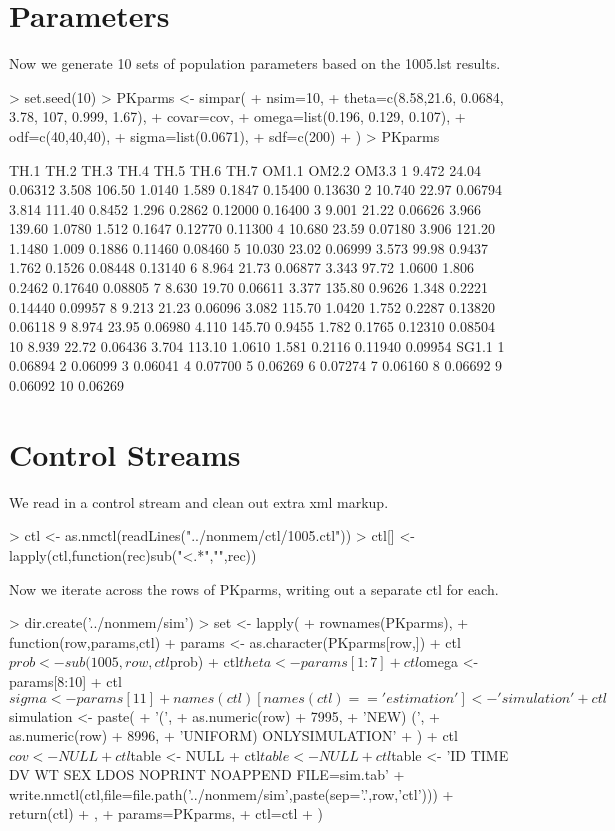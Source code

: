 \section{Parameters}
Now we generate 10 sets of population parameters based on the 1005.lst results.
\begin{Schunk}
\begin{Sinput}
> set.seed(10)
> PKparms <- simpar(
+     nsim=10,
+     theta=c(8.58,21.6, 0.0684, 3.78, 107, 0.999, 1.67),
+     covar=cov,
+     omega=list(0.196, 0.129, 0.107),
+     odf=c(40,40,40),
+     sigma=list(0.0671),
+     sdf=c(200)
+ )
> PKparms
\end{Sinput}
\begin{Soutput}
     TH.1  TH.2    TH.3  TH.4   TH.5   TH.6  TH.7  OM1.1   OM2.2   OM3.3
1   9.472 24.04 0.06312 3.508 106.50 1.0140 1.589 0.1847 0.15400 0.13630
2  10.740 22.97 0.06794 3.814 111.40 0.8452 1.296 0.2862 0.12000 0.16400
3   9.001 21.22 0.06626 3.966 139.60 1.0780 1.512 0.1647 0.12770 0.11300
4  10.680 23.59 0.07180 3.906 121.20 1.1480 1.009 0.1886 0.11460 0.08460
5  10.030 23.02 0.06999 3.573  99.98 0.9437 1.762 0.1526 0.08448 0.13140
6   8.964 21.73 0.06877 3.343  97.72 1.0600 1.806 0.2462 0.17640 0.08805
7   8.630 19.70 0.06611 3.377 135.80 0.9626 1.348 0.2221 0.14440 0.09957
8   9.213 21.23 0.06096 3.082 115.70 1.0420 1.752 0.2287 0.13820 0.06118
9   8.974 23.95 0.06980 4.110 145.70 0.9455 1.782 0.1765 0.12310 0.08504
10  8.939 22.72 0.06436 3.704 113.10 1.0610 1.581 0.2116 0.11940 0.09954
     SG1.1
1  0.06894
2  0.06099
3  0.06041
4  0.07700
5  0.06269
6  0.07274
7  0.06160
8  0.06692
9  0.06092
10 0.06269
\end{Soutput}
\end{Schunk}
\section{Control Streams}
We read in a control stream and clean out extra xml markup.
\begin{Schunk}
\begin{Sinput}
> ctl <- as.nmctl(readLines("../nonmem/ctl/1005.ctl"))
> ctl[] <- lapply(ctl,function(rec)sub("<.*","",rec))
\end{Sinput}
\end{Schunk}
Now we iterate across the rows of PKparms, writing out a separate ctl for each.
\begin{Schunk}
\begin{Sinput}
> dir.create('../nonmem/sim')
> set <- lapply(
+ 	rownames(PKparms),
+ 	function(row,params,ctl){
+ 		params <- as.character(PKparms[row,])
+ 		ctl$prob <- sub(1005,row,ctl$prob)
+ 		ctl$theta <- params[1:7]
+ 		ctl$omega <- params[8:10]
+ 		ctl$sigma <- params[11]
+ 		names(ctl)[names(ctl)=='estimation'] <- 'simulation'
+ 		ctl$simulation <- paste(
+ 			'(',
+ 			as.numeric(row) + 7995,
+ 			'NEW) (',
+ 			as.numeric(row) + 8996,
+ 			'UNIFORM) ONLYSIMULATION'
+ 		)
+ 		ctl$cov <- NULL
+ 		ctl$table <- NULL
+ 		ctl$table <- NULL
+ 		ctl$table <- 'ID TIME DV WT SEX LDOS NOPRINT NOAPPEND FILE=sim.tab'
+ 		write.nmctl(ctl,file=file.path('../nonmem/sim',paste(sep='.',row,'ctl')))
+ 		return(ctl)		
+ 	},
+ 	params=PKparms,
+ 	ctl=ctl
+ )
\end{Sinput}
\end{Schunk}
